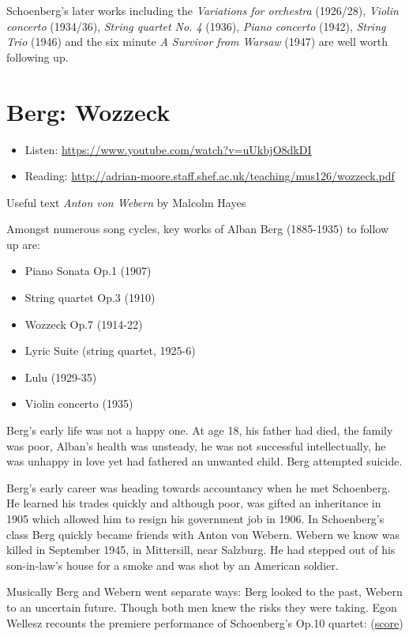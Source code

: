Schoenberg's later works including the \textit{Variations for orchestra} (1926/28), \textit{Violin concerto} (1934/36), \textit{String quartet No. 4} (1936), \textit{Piano concerto} (1942), \textit{String Trio} (1946)
and the six minute \textit{A Survivor from Warsaw} (1947) are well worth following up. 
 
\section{Berg: Wozzeck}
\begin{itemize}
\item Listen: \url{https://www.youtube.com/watch?v=uUkbjO8dkDI}
\item Reading: \url{http://adrian-moore.staff.shef.ac.uk/teaching/mus126/wozzeck.pdf}
\end{itemize}

Useful text \textit{Anton von Webern} by Malcolm Hayes \citeyearpar{hayes1995anton}

Amongst numerous song cycles, key works of Alban Berg (1885-1935) to follow up are:
\begin{itemize}
\item Piano Sonata Op.1 (1907)
\item String quartet Op.3 (1910)
\item Wozzeck Op.7 (1914-22)
\item Lyric Suite (string quartet, 1925-6)
\item Lulu (1929-35)
\item Violin concerto (1935) 
\end{itemize}

Berg's early life was not a happy one. At age 18, his father had died, the family was poor, Alban's health was unsteady, he was not successful intellectually, he was unhappy in love yet had fathered an unwanted child. Berg attempted suicide. 

Berg's early career was heading towards accountancy when he met Schoenberg. He learned his trades quickly and although poor, was gifted an inheritance in 1905 which allowed him to resign his government job in 1906. In Schoenberg's class Berg quickly became friends with Anton von Webern. Webern we know was killed in September 1945, in Mittersill, near Salzburg. He had stepped out of his son-in-law's house for a smoke and was shot by an American soldier. 

Musically Berg and Webern went separate ways: Berg looked to the past, Webern to an uncertain future. Though both men knew the risks they were taking. Egon Wellesz recounts the premiere performance of Schoenberg's Op.10 quartet: (\href{http://conquest.imslp.info/files/imglnks/usimg/c/c1/IMSLP29725-PMLP66179-Schoenberg_-_SQ_No._2_score.pdf}{score})

